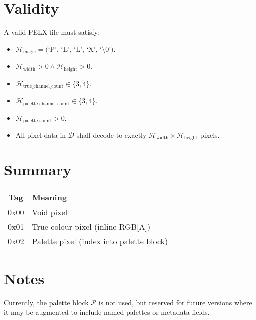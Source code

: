 \documentclass{article}
\begin{document}
\section{Validity}

A valid PELX file must satisfy:

\begin{itemize}
	\item $\mathcal{H}_{\text{magic}} = \text{(`P', `E', `L', `X', `\textbackslash0')}$.
	\item $\mathcal{H}_{\text{width}} > 0 \land \mathcal{H}_{\text{height}} > 0$.
	\item $\mathcal{H}_{\text{true\_channel\_count}} \in \{3, 4\}$.
	\item $\mathcal{H}_{\text{palette\_channel\_count}} \in \{3, 4\}$.
	\item $\mathcal{H}_{\text{palette\_count}} > 0$.
	\item All pixel data in $\mathcal{D}$ shall decode to exactly $\mathcal{H}_{\text{width}} \times \mathcal{H}_{\text{height}}$ pixels.
\end{itemize}

\section{Summary}

\begin{center}
	\renewcommand{\arraystretch}{1.2}

	\begin{tabular}{|c|l|}
		\hline
			Tag & Meaning \\
		\hline
			0x00 & Void pixel \\
			0x01 & True colour pixel (inline RGB[A]) \\
			0x02 & Palette pixel (index into palette block) \\
		\hline
	\end{tabular}

\end{center}

\section{Notes}

Currently, the palette block $\mathcal{P}$ is not used, but reserved for future versions where it may be augmented to include named palettes or metadata fields.
\end{document}
